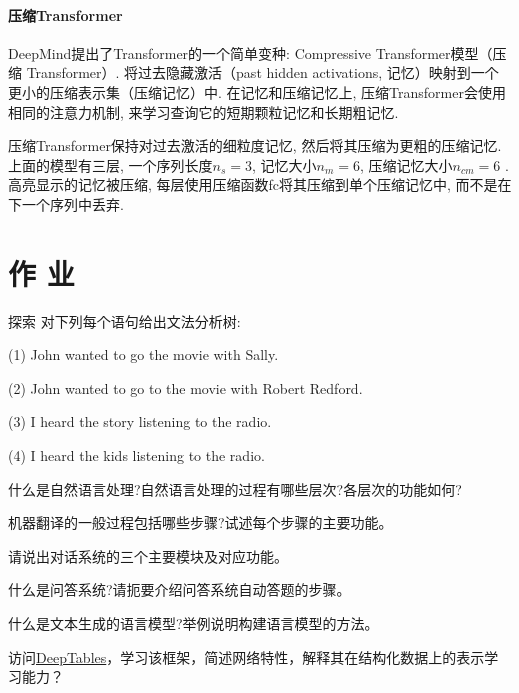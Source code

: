\paragraph{压缩Transformer}

DeepMind提出了Transformer的一个简单变种:  Compressive Transformer模型（压缩 Transformer）.
将过去隐藏激活（past hidden activations, 记忆）映射到一个更小的压缩表示集（压缩记忆）中. 在记忆和压缩记忆上, 压缩Transformer会使用相同的注意力机制, 来学习查询它的短期颗粒记忆和长期粗记忆.

压缩Transformer保持对过去激活的细粒度记忆, 然后将其压缩为更粗的压缩记忆. 上面的模型有三层, 一个序列长度$n_s = 3$, 记忆大小$n_m = 6$, 压缩记忆大小$n_{cm} = 6$ \cite{raecompressive2019}. 高亮显示的记忆被压缩, 每层使用压缩函数fc将其压缩到单个压缩记忆中, 而不是在下一个序列中丢弃.
\section{作 业 }
\begin{custom}[explorecolor]{探索}
对下列每个语句给出文法分析树:

    (1)  John  wanted  to  go  the  movie  with  Sally.

    (2)  John  wanted  to  go  to  the  movie  with  Robert  Redford.

    (3)  I  heard  the  story  listening  to  the  radio.

    (4)  I  heard  the  kids  listening  to  the  radio.
\end{custom}

\begin{think}
    什么是自然语言处理?自然语言处理的过程有哪些层次?各层次的功能如何?
\end{think}

\begin{think}
    机器翻译的一般过程包括哪些步骤?试述每个步骤的主要功能。
\end{think}
\begin{think}
    请说出对话系统的三个主要模块及对应功能。
\end{think}

\begin{think}
    什么是问答系统?请扼要介绍问答系统自动答题的步骤。
\end{think}

\begin{think}
    什么是文本生成的语言模型?举例说明构建语言模型的方法。
\end{think}

\begin{think}
    访问\href{https://github.com/DataCanvasIO/deeptables}{DeepTables}，学习该框架，简述网络特性，解释其在结构化数据上的表示学习能力？
\end{think} 